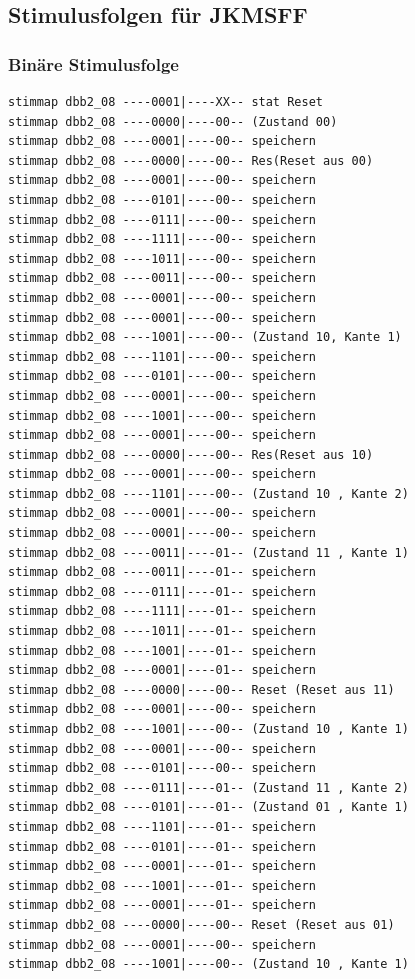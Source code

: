 \documentclass[fleqn]{article}
\begin{document}
\subsection{Stimulusfolgen für JKMSFF}

\subsubsection{Binäre Stimulusfolge}
\begin{lstlisting}
stimmap dbb2_08 ----0001|----XX-- stat Reset
stimmap dbb2_08 ----0000|----00-- (Zustand 00)
stimmap dbb2_08 ----0001|----00-- speichern
stimmap dbb2_08 ----0000|----00-- Res(Reset aus 00)
stimmap dbb2_08 ----0001|----00-- speichern
stimmap dbb2_08 ----0101|----00-- speichern
stimmap dbb2_08 ----0111|----00-- speichern
stimmap dbb2_08 ----1111|----00-- speichern
stimmap dbb2_08 ----1011|----00-- speichern
stimmap dbb2_08 ----0011|----00-- speichern
stimmap dbb2_08 ----0001|----00-- speichern
stimmap dbb2_08 ----0001|----00-- speichern
stimmap dbb2_08 ----1001|----00-- (Zustand 10, Kante 1)
stimmap dbb2_08 ----1101|----00-- speichern
stimmap dbb2_08 ----0101|----00-- speichern
stimmap dbb2_08 ----0001|----00-- speichern
stimmap dbb2_08 ----1001|----00-- speichern
stimmap dbb2_08 ----0001|----00-- speichern
stimmap dbb2_08 ----0000|----00-- Res(Reset aus 10)
stimmap dbb2_08 ----0001|----00-- speichern
stimmap dbb2_08 ----1101|----00-- (Zustand 10 , Kante 2)
stimmap dbb2_08 ----0001|----00-- speichern
stimmap dbb2_08 ----0001|----00-- speichern
stimmap dbb2_08 ----0011|----01-- (Zustand 11 , Kante 1)
stimmap dbb2_08 ----0011|----01-- speichern
stimmap dbb2_08 ----0111|----01-- speichern
stimmap dbb2_08 ----1111|----01-- speichern
stimmap dbb2_08 ----1011|----01-- speichern
stimmap dbb2_08 ----1001|----01-- speichern
stimmap dbb2_08 ----0001|----01-- speichern
stimmap dbb2_08 ----0000|----00-- Reset (Reset aus 11)
stimmap dbb2_08 ----0001|----00-- speichern
stimmap dbb2_08 ----1001|----00-- (Zustand 10 , Kante 1)
stimmap dbb2_08 ----0001|----00-- speichern
stimmap dbb2_08 ----0101|----00-- speichern
stimmap dbb2_08 ----0111|----01-- (Zustand 11 , Kante 2)
stimmap dbb2_08 ----0101|----01-- (Zustand 01 , Kante 1)
stimmap dbb2_08 ----1101|----01-- speichern
stimmap dbb2_08 ----0101|----01-- speichern
stimmap dbb2_08 ----0001|----01-- speichern
stimmap dbb2_08 ----1001|----01-- speichern
stimmap dbb2_08 ----0001|----01-- speichern
stimmap dbb2_08 ----0000|----00-- Reset (Reset aus 01)
stimmap dbb2_08 ----0001|----00-- speichern
stimmap dbb2_08 ----1001|----00-- (Zustand 10 , Kante 1)

\end{lstlisting}
\end{document}
